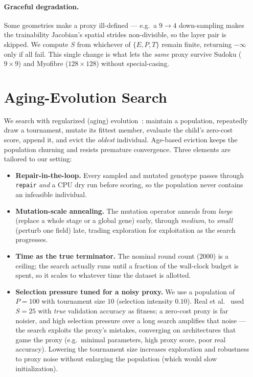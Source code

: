 \documentclass[10pt,twocolumn]{article}
\newcommand{\code}[1]{\texttt{\small #1}}
\begin{document}
\paragraph{Graceful degradation.} Some geometries make a proxy ill-defined ---
e.g.\ a $9\!\to\!4$ down-sampling makes the trainability Jacobian's spatial
strides non-divisible, so the layer pair is skipped. We compute $S$ from
whichever of $\{E,P,T\}$ remain finite, returning $-\infty$ only if all fail.
This single change is what lets the \emph{same} proxy survive Sudoku
($9{\times}9$) and Myofibre ($128{\times}128$) without special-casing.

\section{Aging-Evolution Search}
\label{sec:search}

We search with regularized (aging) evolution~\cite{regevo2019}: maintain a
population, repeatedly draw a tournament, mutate its fittest member, evaluate
the child's zero-cost score, append it, and evict the \emph{oldest} individual.
Age-based eviction keeps the population churning and resists premature
convergence. Three elements are tailored to our setting:

\begin{itemize}\itemsep2pt
\item \textbf{Repair-in-the-loop.} Every sampled and mutated genotype passes
  through \code{repair} \emph{and} a CPU dry run before scoring, so the
  population never contains an infeasible individual.
\item \textbf{Mutation-scale annealing.} The mutation operator anneals from
  \emph{large} (replace a whole stage or a global gene) early, through
  \emph{medium}, to \emph{small} (perturb one field) late, trading exploration
  for exploitation as the search progresses.
\item \textbf{Time as the true terminator.} The nominal round count
  ($2000$) is a ceiling; the search actually runs until a fraction of the
  wall-clock budget is spent, so it scales to whatever time the dataset is
  allotted.
\item \textbf{Selection pressure tuned for a noisy proxy.} We use a population
  of $P{=}100$ with tournament size $10$ (selection intensity $0.10$). Real
  et al.~\cite{regevo2019} used $S{=}25$ with \emph{true} validation accuracy as
  fitness; a zero-cost proxy is far noisier, and high selection pressure over a
  long search amplifies that noise --- the search exploits the proxy's mistakes,
  converging on architectures that game the proxy (e.g.\ minimal parameters,
  high proxy score, poor real accuracy). Lowering the tournament size increases
  exploration and robustness to proxy noise without enlarging the population
  (which would slow initialization).
\end{itemize}
\end{document}
